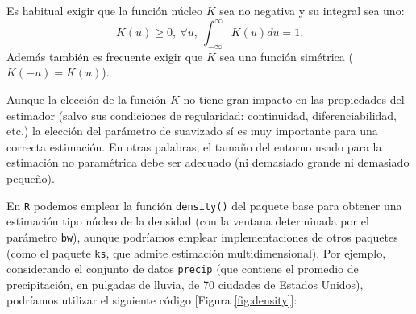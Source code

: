 \documentclass[
]{book}
\newenvironment{Shaded}{\begin{snugshade}}{\end{snugshade}}
\newcommand{\CommentTok}[1]{\textcolor[rgb]{0.56,0.35,0.01}{\textit{#1}}}
\newcommand{\DataTypeTok}[1]{\textcolor[rgb]{0.13,0.29,0.53}{#1}}
\newcommand{\DecValTok}[1]{\textcolor[rgb]{0.00,0.00,0.81}{#1}}
\newcommand{\FloatTok}[1]{\textcolor[rgb]{0.00,0.00,0.81}{#1}}
\newcommand{\KeywordTok}[1]{\textcolor[rgb]{0.13,0.29,0.53}{\textbf{#1}}}
\newcommand{\NormalTok}[1]{#1}
\newcommand{\OperatorTok}[1]{\textcolor[rgb]{0.81,0.36,0.00}{\textbf{#1}}}
\newcommand{\OtherTok}[1]{\textcolor[rgb]{0.56,0.35,0.01}{#1}}
\newcommand{\StringTok}[1]{\textcolor[rgb]{0.31,0.60,0.02}{#1}}
\theoremstyle{definition}
\theoremstyle{definition}
\theoremstyle{definition}
\theoremstyle{remark}
\begin{document}
Es habitual exigir que la función núcleo \(K\) sea no negativa y su
integral sea uno:
\[K\left( u \right) \geq 0,~\forall u,~\int_{-\infty }^{\infty }K\left(u \right) du=1.\]
Además también es frecuente exigir que \(K\) sea una
función simétrica (\(K\left( -u \right) =K\left( u \right)\)).

Aunque la elección de la función \(K\) no tiene gran impacto en las
propiedades del estimador (salvo sus condiciones de regularidad:
continuidad, diferenciabilidad, etc.) la elección del parámetro de
suavizado sí es muy importante para una correcta estimación. En otras
palabras, el tamaño del entorno usado para la estimación no paramétrica
debe ser adecuado (ni demasiado grande ni demasiado pequeño).

En \texttt{R} podemos emplear la función \texttt{density()} del paquete base para obtener
una estimación tipo núcleo de la densidad (con la ventana determinada
por el parámetro \texttt{bw}), aunque podríamos emplear implementaciones de otros
paquetes (como el paquete \texttt{ks}, que admite estimación multidimensional).
Por ejemplo, considerando el conjunto de datos \texttt{precip} (que contiene el promedio de precipitación, en pulgadas de lluvia, de 70 ciudades de Estados Unidos), podríamos utilizar el siguiente código {[}Figura \ref{fig:density}{]}:

\begin{Shaded}
\end{Shaded}
\end{document}
